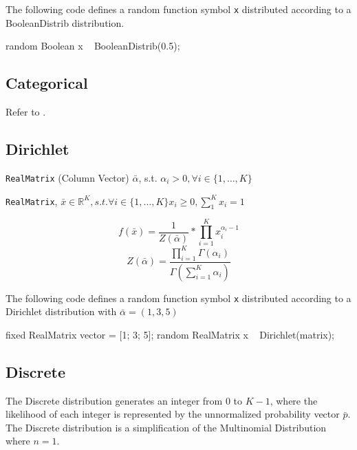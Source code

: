 The following code defines a random function symbol \verb|x| distributed according to a BooleanDistrib distribution.
\begin{blogcode}
random Boolean x ~ BooleanDistrib(0.5);
\end{blogcode}

\subsection{Categorical}
Refer to .

\subsection{Dirichlet}

\begin{itemize*}
\item[] \verb|RealMatrix| (Column Vector) $\bar{\alpha}$, s.t. $\alpha_{i} > 0, \forall i \in \{1, \ldots, K\}$ 
\end{itemize*}

\begin{itemize*}
\item[] \verb|RealMatrix|, $\bar{x} \in \mathbb{R}^{K}, s.t. \forall i \in \{1, \ldots, K\} x_{i} \geq 0, \sum_{1}^{K} x_{i} = 1 $
\end{itemize*}

\[
	f(\bar{x}) = \frac{1}{Z(\bar{\alpha})} * \prod_{i=1}^{K} x_{i}^{\alpha_{i} - 1}
\]
\[ Z(\bar{\alpha}) = \frac{ \prod_{i=1}^{K} \Gamma(\alpha_{i})   }{ \Gamma(\sum_{i=1}^{K} \alpha_{i} )  } 
\]

The following code defines a random function symbol \verb|x| distributed according to a Dirichlet distribution with $\bar{\alpha} = (1, 3, 5) $
\begin{blogcode}
fixed RealMatrix vector = [1; 3; 5];
random RealMatrix x ~ Dirichlet(matrix);
\end{blogcode}

\subsection{Discrete}
The Discrete distribution generates an integer from $0$ to $K-1$, where the likelihood of each integer is represented by the unnormalized probability vector $\bar{p}$. The Discrete distribution is a simplification of the Multinomial Distribution where $n=1$.

